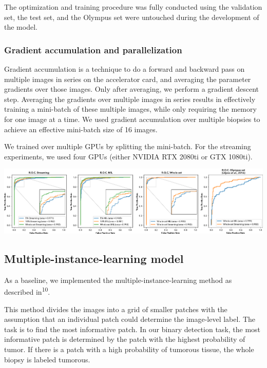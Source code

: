\documentclass[
  12pt,
  a5,margin=2cmpaper,
]{article}
\begin{document}
The optimization and training procedure was fully conducted using the
validation set, the test set, and the Olympus set were untouched during
the development of the model.

\hypertarget{gradient-accumulation-and-parallelization}{%
\subsubsection{Gradient accumulation and
parallelization}\label{gradient-accumulation-and-parallelization}}

Gradient accumulation is a technique to do a forward and backward pass
on multiple images in series on the accelerator card, and averaging the
parameter gradients over those images. Only after averaging, we perform
a gradient descent step. Averaging the gradients over multiple images in
series results in effectively training a mini-batch of these multiple
images, while only requiring the memory for one image at a time. We used
gradient accumulation over multiple biopsies to achieve an effective
mini-batch size of 16 images.

We trained over multiple GPUs by splitting the mini-batch. For the
streaming experiments, we used four GPUs (either NVIDIA RTX 2080ti or
GTX 1080ti).

\includegraphics{chpt3_imgs/auc_both.png}

\hypertarget{multiple-instance-learning-model}{%
\subsection{Multiple-instance-learning
model}\label{multiple-instance-learning-model}}

As a baseline, we implemented the multiple-instance-learning method as
described in\textsuperscript{10}.

This method divides the images into a grid of smaller patches with the
assumption that an individual patch could determine the image-level
label. The task is to find the most informative patch. In our binary
detection task, the most informative patch is determined by the patch
with the highest probability of tumor. If there is a patch with a high
probability of tumorous tissue, the whole biopsy is labeled tumorous.
\end{document}
